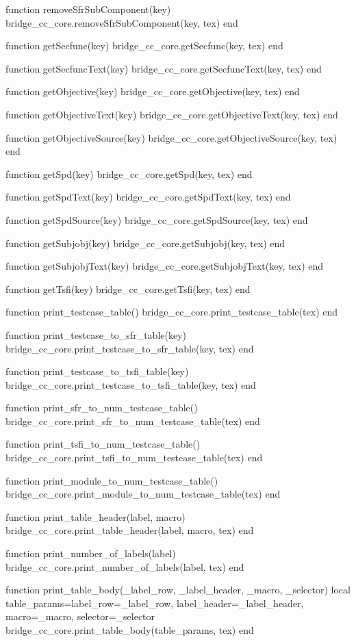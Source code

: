\begin{luacode}
  function removeSfrSubComponent(key)
    bridge_cc_core.removeSfrSubComponent(key, tex)
  end

  function getSecfunc(key)
    bridge_cc_core.getSecfunc(key, tex)
  end

  function getSecfuncText(key)
    bridge_cc_core.getSecfuncText(key, tex)
  end

  function getObjective(key)
    bridge_cc_core.getObjective(key, tex)
  end

  function getObjectiveText(key)
    bridge_cc_core.getObjectiveText(key, tex)
  end

  function getObjectiveSource(key)
    bridge_cc_core.getObjectiveSource(key, tex)
  end

  function getSpd(key)
    bridge_cc_core.getSpd(key, tex)
  end

  function getSpdText(key)
    bridge_cc_core.getSpdText(key, tex)
  end

  function getSpdSource(key)
    bridge_cc_core.getSpdSource(key, tex)
  end

  function getSubjobj(key)
    bridge_cc_core.getSubjobj(key, tex)
  end

  function getSubjobjText(key)
    bridge_cc_core.getSubjobjText(key, tex)
  end

  function getTsfi(key)
    bridge_cc_core.getTsfi(key, tex)
  end

  function print_testcase_table()
    bridge_cc_core.print_testcase_table(tex)
  end

  function print_testcase_to_sfr_table(key)
    bridge_cc_core.print_testcase_to_sfr_table(key, tex)
  end

  function print_testcase_to_tsfi_table(key)
    bridge_cc_core.print_testcase_to_tsfi_table(key, tex)
  end

  function print_sfr_to_num_testcase_table()
    bridge_cc_core.print_sfr_to_num_testcase_table(tex)
  end

  function print_tsfi_to_num_testcase_table()
    bridge_cc_core.print_tsfi_to_num_testcase_table(tex)
  end

  function print_module_to_num_testcase_table()
    bridge_cc_core.print_module_to_num_testcase_table(tex)
  end

  function print_table_header(label, macro)
    bridge_cc_core.print_table_header(label, macro, tex)
  end

  function print_number_of_labels(label)
    bridge_cc_core.print_number_of_labels(label, tex)
  end

  function print_table_body(_label_row, _label_header, _macro, _selector)
  local table_params={label_row=_label_row, label_header=_label_header, macro=_macro, selector=_selector}
    bridge_cc_core.print_table_body(table_params, tex)
  end

\end{luacode}
